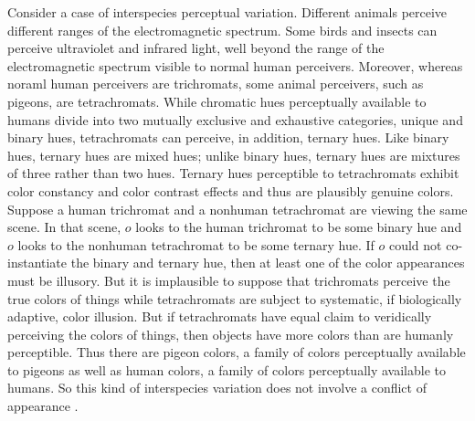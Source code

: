 \documentclass[12pt]{article}
\begin{document}
Consider a case of interspecies perceptual variation. Different animals perceive different ranges of the electromagnetic spectrum. Some birds and insects can perceive ultraviolet and infrared light, well beyond the range of the electromagnetic spectrum visible to normal human perceivers. Moreover, whereas noraml human perceivers are trichromats, some animal perceivers, such as pigeons, are tetrachromats.  While chromatic hues perceptually available to humans divide into two mutually exclusive and exhaustive categories, unique and binary hues, tetrachromats can perceive, in addition, ternary hues. Like binary hues, ternary hues are mixed hues; unlike binary hues, ternary hues are mixtures of three rather than two hues. Ternary hues perceptible to tetrachromats exhibit color constancy and color contrast effects and thus are plausibly genuine colors. Suppose a human trichromat and a nonhuman tetrachromat are viewing the same scene. In that scene, \( o \) looks to the human trichromat to be some binary hue and \( o \) looks to the nonhuman tetrachromat to be some ternary hue. If \( o \) could not co-instantiate the binary and ternary hue, then at least one of the color appearances must be illusory. But it is implausible to suppose that trichromats perceive the true colors of things while tetrachromats are subject to systematic, if biologically adaptive, color illusion. But if tetrachromats have equal claim to veridically perceiving the colors of things, then objects have more colors than are humanly perceptible. Thus there are pigeon colors, a family of colors perceptually available to pigeons as well as human colors, a family of colors perceptually available to humans. So this kind of interspecies variation does not involve a conflict of appearance \citep[see][]{Allen:2005be,Kalderon:2006tg,Mizrahi:2006zr}. 
\end{document}
